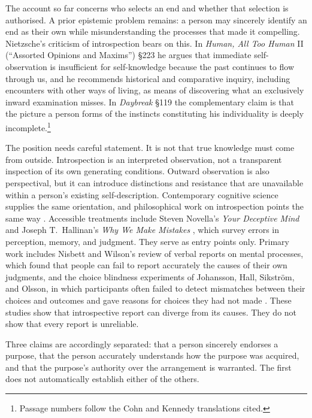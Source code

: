 \documentclass[11pt]{article}
\theoremstyle{definition}
\theoremstyle{remark}
\begin{document}
The account so far concerns who selects an end and whether that selection is authorised. A prior epistemic problem remains: a person may sincerely identify an end as their own while misunderstanding the processes that made it compelling. Nietzsche's criticism of introspection bears on this. In \emph{Human, All Too Human} II (``Assorted Opinions and Maxims'') \S223 \cite{nietzscheHAH2} he argues that immediate self-observation is insufficient for self-knowledge because the past continues to flow through us, and he recommends historical and comparative inquiry, including encounters with other ways of living, as means of discovering what an exclusively inward examination misses. In \emph{Daybreak} \S119 \cite{nietzscheDawn} the complementary claim is that the picture a person forms of the instincts constituting his individuality is deeply incomplete.\footnote{Passage numbers follow the Cohn and Kennedy translations cited.}

The position needs careful statement. It is not that true knowledge must come from outside. Introspection is an interpreted observation, not a transparent inspection of its own generating conditions. Outward observation is also perspectival, but it can introduce distinctions and resistance that are unavailable within a person's existing self-description. Contemporary cognitive science supplies the same orientation, and philosophical work on introspection points the same way \cite{schwitzgebel2008,wilson2002}. Accessible treatments include Steven Novella's \emph{Your Deceptive Mind} \cite{novella} and Joseph T.\ Hallinan's \emph{Why We Make Mistakes} \cite{hallinan2009}, which survey errors in perception, memory, and judgment. They serve as entry points only. Primary work includes Nisbett and Wilson's review of verbal reports on mental processes, which found that people can fail to report accurately the causes of their own judgments, and the choice blindness experiments of Johansson, Hall, Sikstr\"om, and Olsson, in which participants often failed to detect mismatches between their choices and outcomes and gave reasons for choices they had not made \cite{nisbettwilson1977,johansson2005}. These studies show that introspective report can diverge from its causes. They do not show that every report is unreliable.

Three claims are accordingly separated: that a person sincerely endorses a purpose, that the person accurately understands how the purpose was acquired, and that the purpose's authority over the arrangement is warranted. The first does not automatically establish either of the others.
\end{document}
